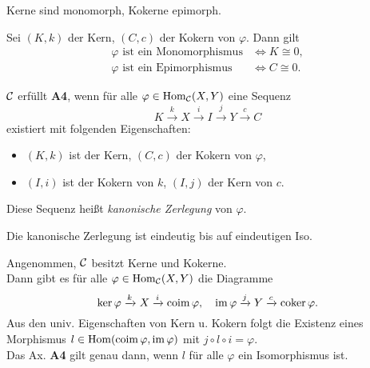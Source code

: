 \documentclass{cheat-sheet}
\DeclareMathOperator{\coker}{coker} %
\DeclareMathOperator{\coim}{coim} %
\begin{document}
\begin{lem}
  Kerne sind monomorph, Kokerne epimorph.
\end{lem}

\begin{lem}
  Sei $(K, k)$ der Kern, $(C, c)$ der Kokern von $\varphi$. Dann gilt
  \begin{align*}
    \varphi \text{ ist ein Monomorphismus} & \iff K \cong 0, \\
    \varphi \text{ ist ein Epimorphismus} & \iff C \cong 0.
  \end{align*}
\end{lem}

\begin{axiom}
  $\mathcal{C}$ erfüllt \textbf{A4}, wenn für alle $\varphi \in \operatorname{Hom}_{\mathcal{C}}(X, Y)$ eine Sequenz
  \[ K \xrightarrow{k} X \xrightarrow{i} I \xrightarrow{j} Y \xrightarrow{c} C \]
  existiert mit folgenden Eigenschaften: 
  \begin{itemize}
    \item $(K, k)$ ist der Kern, $(C, c)$ der Kokern von $\varphi$,
    \item $(I, i)$ ist der Kokern von $k$, $(I, j)$ der Kern von $c$.
  \end{itemize}
  Diese Sequenz heißt \emph{kanonische Zerlegung} von $\varphi$.
\end{axiom}

\begin{bem}
  Die kanonische Zerlegung ist eindeutig bis auf eindeutigen Iso.
\end{bem}

\begin{bem}
  Angenommen, $\mathcal{C}$ besitzt Kerne und Kokerne. \\
  Dann gibt es für alle $\varphi \in \operatorname{Hom}_{\mathcal{C}}(X, Y)$ die Diagramme
  \[
    \ker \varphi \xrightarrow{k} X \xrightarrow{i} \coim \varphi, \quad
    \im \varphi \xrightarrow{j} Y \xrightarrow{c} \coker \varphi.
  \]
  Aus den univ. Eigenschaften von Kern u. Kokern folgt die Existenz eines Morphismus $l \in \Hom(\coim \varphi, \im \varphi)$ mit $j \circ l \circ i = \varphi$. \\
  Das Ax. \textbf{A4} gilt genau dann, wenn $l$ für alle $\varphi$ ein Isomorphismus ist.
\end{bem}

\end{document}
